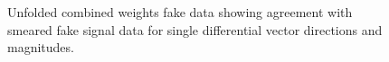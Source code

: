 \documentclass{article}
\begin{document}
\begin{figure}
    \caption{Unfolded combined weights fake data showing agreement with smeared fake signal data for single differential vector directions and magnitudes.}
    \label{fig:combined-fake-data-vector}
\end{figure}
\end{document}

